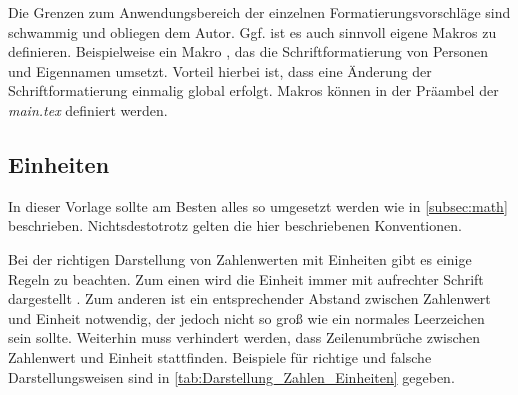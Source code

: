 \begin{table}%
    \centering%
    \caption{Konventionsvorschläge zur Text-Hervorhebung \label{tab:Konventionen_Hervorhebung}}%
\end{table}%

Die Grenzen zum Anwendungsbereich der einzelnen Formatierungsvorschläge sind schwammig und obliegen dem Autor. Ggf. ist es auch sinnvoll eigene Makros zu definieren. Beispielweise ein Makro \command{\person{}}, das die Schriftformatierung von Personen und Eigennamen umsetzt. Vorteil hierbei ist, dass eine Änderung der Schriftformatierung einmalig global erfolgt. Makros können in der Präambel der \textit{main.tex} definiert werden.

\subsection{Einheiten}
\label{sec:Einheiten}

In dieser Vorlage sollte am Besten alles so umgesetzt werden wie in \cref{subsec:math} beschrieben. Nichtsdestotrotz gelten die hier beschriebenen Konventionen.

Bei der richtigen Darstellung von Zahlenwerten mit Einheiten gibt es einige Regeln zu beachten. Zum einen wird die Einheit immer mit aufrechter Schrift dargestellt \cite{PTBSI}. Zum anderen ist ein entsprechender Abstand zwischen Zahlenwert und Einheit notwendig, der jedoch nicht so groß wie ein normales Leerzeichen sein sollte. Weiterhin muss verhindert werden, dass Zeilenumbrüche zwischen Zahlenwert und Einheit stattfinden. Beispiele für richtige und falsche Darstellungsweisen sind in \cref{tab:Darstellung_Zahlen_Einheiten} gegeben.

